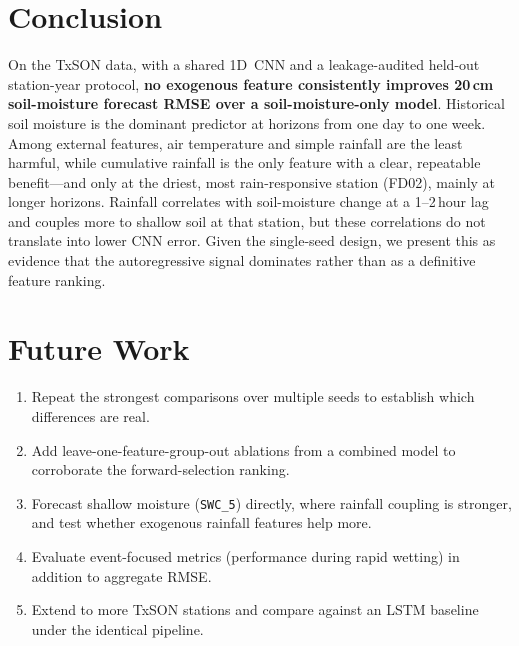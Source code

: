 \documentclass[11pt]{article}
\begin{document}
\section{Conclusion}

On the TxSON data, with a shared 1D~CNN and a leakage-audited held-out
station-year protocol, \textbf{no exogenous feature consistently improves
20\,cm soil-moisture forecast RMSE over a soil-moisture-only model}. Historical
soil moisture is the dominant predictor at horizons from one day to one week.
Among external features, air temperature and simple rainfall are the least
harmful, while cumulative rainfall is the only feature with a clear, repeatable
benefit---and only at the driest, most rain-responsive station (FD02), mainly at
longer horizons. Rainfall correlates with soil-moisture change at a 1--2\,hour
lag and couples more to shallow soil at that station, but these correlations do
not translate into lower CNN error. Given the single-seed design, we present this
as evidence that the autoregressive signal dominates rather than as a definitive
feature ranking.

\section{Future Work}

\begin{enumerate}
    \item Repeat the strongest comparisons over multiple seeds to establish which
    differences are real.
    \item Add leave-one-feature-group-out ablations from a combined model to
    corroborate the forward-selection ranking.
    \item Forecast shallow moisture (\texttt{SWC\_5}) directly, where rainfall
    coupling is stronger, and test whether exogenous rainfall features help more.
    \item Evaluate event-focused metrics (performance during rapid wetting) in
    addition to aggregate RMSE.
    \item Extend to more TxSON stations and compare against an LSTM baseline under
    the identical pipeline.
\end{enumerate}



\end{document}
